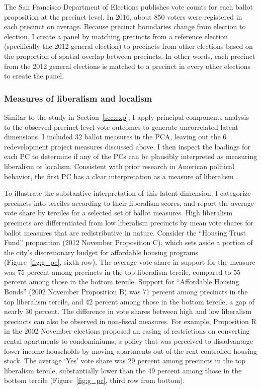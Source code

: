 \documentclass[article,11pt]{memoir}
\begin{document}
The San Francisco Department of Elections publishes vote counts for each ballot proposition at the precinct level. In 2016, about 850 voters were registered in each precinct on average. Because precinct boundaries change from election to election, I create a panel by matching precincts from a reference election (specifically the 2012 general election) to precincts from other elections based on the proportion of spatial overlap between precincts. In other words, each precinct from the 2012 general elections is matched to a precinct in every other elections to create the panel.

\subsubsection{Measures of liberalism and localism}

Similar to the study in Section~\ref{sec:exp}, I apply principal components analysis to the observed precinct-level vote outcomes to generate uncorrelated latent dimensions. I included 32 ballot measures in the PCA, leaving out the 6 redevelopment project measures discussed above.  I then inspect the loadings for each PC to determine if any of the PCs can be plausibly interpreted as measuring liberalism or localism.  Consistent with prior research in American political behavior, the first PC has a clear interpretation as a measure of liberalism \citep[e.g.][]{ansolabehere_candidate_2001-1,tausanovitch_measuring_2013}.  

To illustrate the substantive interpretation of this latent dimension, I categorize precincts into terciles according to their liberalism scores, and report the average vote share by terciles for a selected set of ballot measures.  High liberalism precincts are differentiated from low liberalism precincts by mean vote shares for ballot measures that are redistributive in nature.  Consider the ``Housing Trust Fund'' proposition (2012 November Proposition C), which sets aside a portion of the city's discretionary budget for affordable housing programs (Figure~\ref{fig:g_pc}, sixth row).  The average vote share in support for the measure was 75 percent among precincts in the top liberalism tercile, compared to 55 percent among those in the bottom tercile.  Support for ``Affordable Housing Bonds'' (2002 November Proposition B) was 71 percent among precincts in the top liberalism tercile, and 42 percent among those in the bottom tercile, a gap of nearly 30 percent.  The difference in vote shares between high and low liberalism precincts can also be observed in non-fiscal measures.  For example, Proposition R in the 2002 November elections proposed an easing of restrictions on converting rental apartments to condominiums, a policy that was perceived to disadvantage lower-income households by moving apartments out of the rent-controlled housing stock.  The average `Yes' vote share was 29 percent among precincts in the top liberalism tercile, substantially lower than the 49 percent among those in the bottom tercile (Figure~\ref{fig:g_pc}, third row from bottom).
\end{document}
